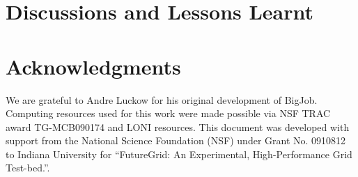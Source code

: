 \documentclass{sig-alternate}
\begin{document}
\section{Discussions and Lessons Learnt}


\section{Acknowledgments}
We are grateful to Andre Luckow for his original development of
BigJob.  Computing resources used for this work were made possible via
NSF TRAC award TG-MCB090174 and LONI resources.  This document was
developed with support from the National Science Foundation (NSF)
under Grant No.  0910812 to Indiana University for ``FutureGrid: An
Experimental, High-Performance Grid Test-bed.''.



\end{document}
